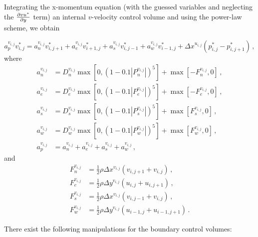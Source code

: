 \documentclass{article}
\begin{document}
Integrating the x-momentum equation (with the guessed variables and neglecting the $\pdv{vu^*}{y}$ term) an internal $v$-velocity control volume and using the power-law scheme, we obtain

\begin{equation}
	a^{v_{i,j}}_p v^*_{i,j} = a^{v_{i,j}}_n v^*_{i, j+1} + a^{v_{i,j}}_e v^*_{i+1, j} + a^{v_{i,j}}_s v^*_{i, j-1} + a^{v_{i,j}}_w v^*_{i-1, j} + \Delta x^{u_{i,j}} (p^*_{i,j} - p^*_{i, j+1})\,,
\end{equation}
where
\begin{subequations}
	\begin{align}
	a^{v_{i,j}}_n & = D^{v_{i,j}}_n \max \left[0, (1 - 0.1 |P^{v_{i,j}}_n|)^5\right] + \max \left[ -F^{v_{i,j}}_n, 0 \right]\,, \\
	a^{v_{i,j}}_e & = D^{v_{i,j}}_e \max \left[0, (1 - 0.1 |P^{v_{i,j}}_e|)^5\right] + \max \left[ -F^{v_{i,j}}_e, 0 \right]\,, \\
	a^{v_{i,j}}_s & = D^{v_{i,j}}_s \max \left[0, (1 - 0.1 |P^{v_{i,j}}_s|)^5\right] + \max \left[ F^{v_{i,j}}_s, 0 \right]\,, \\
	a^{v_{i,j}}_w & = D^{v_{i,j}}_w \max \left[0, (1 - 0.1 |P^{v_{i,j}}_w|)^5\right] + \max \left[ F^{v_{i,j}}_w, 0 \right]\,, \\
	a^{v_{i,j}}_p & = a^{v_{i,j}}_n + a^{v_{i,j}}_e + a^{v_{i,j}}_s + a^{v_{i,j}}_w\,,
	\end{align}
\end{subequations}
and
\begin{subequations}
	\begin{align}
	F_n^{v_{i,j}} & = \frac{1}{2} \rho \Delta x^{v_{i,j}} \left(v_{i,j+1} + v_{i,j}\right)\,, \\
	F_e^{v_{i,j}} & = \frac{1}{2} \rho \Delta y^{v_{i,j}} \left(u_{i,j} + u_{i,j+1}\right)\,, \\
	F_s^{v_{i,j}} & = \frac{1}{2} \rho \Delta x^{v_{i,j}} \left(v_{i,j-1} + v_{i,j}\right)\,, \\
	F_w^{v_{i,j}} & = \frac{1}{2} \rho \Delta y^{v_{i,j}} \left(u_{i-1,j} + u_{i-1,j+1}\right)\,.
	\end{align}
\end{subequations}

There exist the following manipulations for the boundary control volumes:
\end{document}
